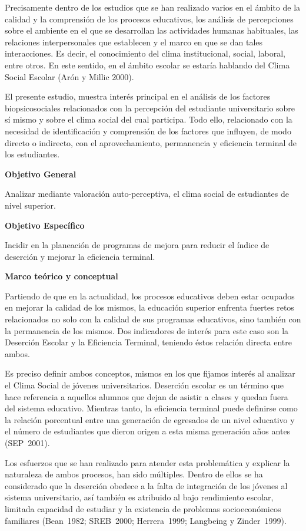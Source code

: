  
Precisamente dentro de los estudios que se han realizado varios en el ámbito
de la calidad y la comprensión de los procesos educativos, los análisis de
percepciones sobre el ambiente en el que se desarrollan las actividades
humanas habituales, las relaciones interpersonales que establecen y el
marco en que se dan tales interacciones. Es decir, el conocimiento del
clima institucional, social, laboral, entre otros. En este sentido, en el
ámbito escolar se estaría hablando del Clima Social Escolar (Arón y Millic
2000).

 
El presente estudio, muestra interés principal en el análisis de los
factores biopsicosociales relacionados con la percepción del estudiante
universitario sobre sí mismo y sobre el clima social del cual participa.
Todo ello, relacionado con la necesidad de identificación y comprensión de
los factores que influyen, de modo directo o indirecto, con el
aprovechamiento, permanencia y eficiencia terminal de los estudiantes.

 
\textbf{Objetivo General}

 
Analizar mediante valoración auto-perceptiva, el clima social de estudiantes
de nivel superior.

 
\textbf{Objetivo Específico}

 
Incidir en la planeación de programas de mejora para reducir el índice de
deserción y mejorar la eficiencia terminal.

 
\textbf{Marco teórico y conceptual}

 
Partiendo de que en la actualidad, los procesos educativos deben estar
ocupados en mejorar la calidad de los mismos, la educación superior
enfrenta fuertes retos relacionados no solo con la calidad de sus programas
educativos, sino también con la permanencia de los mismos. Dos indicadores
de interés para este caso son la Deserción Escolar y la Eficiencia Terminal,
teniendo éstos relación directa entre ambos.

 
Es preciso definir ambos conceptos, mismos en los que fijamos interés al
analizar el Clima Social de jóvenes universitarios. Deserción escolar es un
término que hace referencia a aquellos alumnos que dejan de asistir a
clases y quedan fuera del sistema educativo. Mientras tanto, la eficiencia
terminal puede definirse como la relación porcentual entre una generación
de egresados de un nivel educativo y el número de estudiantes que dieron
origen a esta misma generación años antes (SEP~2001).
\newpage
 
Los esfuerzos que se han realizado para atender esta problemática  y
explicar la naturaleza de ambos procesos, han sido múltiples. Dentro de
ellos  se ha considerado que la deserción obedece a la falta de integración
de los jóvenes al sistema universitario, así también es atribuido al bajo
rendimiento escolar, limitada capacidad de estudiar y la existencia de
problemas socioeconómicos familiares (Bean~1982; SREB~2000; Herrera~1999; 
Langbeing y Zinder~1999). 

